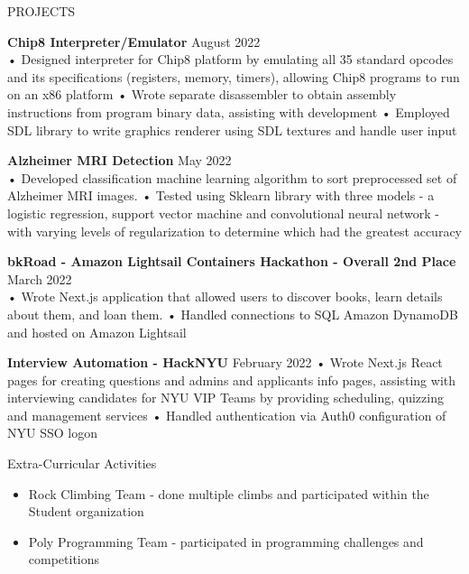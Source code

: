 \documentclass{resume} %
\begin{document}
\begin{rSection}{PROJECTS}

\textbf{Chip8 Interpreter/Emulator } \hfill August 2022 \\
• Designed interpreter for Chip8 platform by emulating all 35 standard opcodes and its specifications (registers, memory, timers), allowing Chip8 programs to run on an x86 platform \newline
• Wrote separate disassembler to obtain assembly instructions from program binary data, assisting with development  \newline
• Employed SDL library to write graphics renderer using SDL textures and handle user input \smallskip

\textbf{Alzheimer MRI Detection } \hfill May 2022 \\
• Developed classification machine learning algorithm to sort preprocessed set of Alzheimer MRI images. 
\newline
• Tested using Sklearn library with three models - a logistic regression, support vector machine and convolutional neural network - with varying levels of regularization to determine which had the greatest accuracy 

\textbf{bkRoad - Amazon Lightsail Containers Hackathon - Overall 2nd Place } \hfill March 2022 \\
• Wrote Next.js application that allowed users to discover books, learn details about them, and loan them. \newline
• Handled connections to SQL Amazon DynamoDB and hosted on Amazon Lightsail

\textbf{Interview Automation - HackNYU} \hfill February 2022 \newline
• Wrote Next.js React pages for creating questions and admins and  applicants info pages, assisting with interviewing candidates for NYU VIP Teams by providing scheduling, quizzing and management services\newline
• Handled authentication via Auth0 configuration of NYU SSO logon \smallskip

\end{rSection} 

\begin{rSection}{Extra-Curricular Activities} 
\begin{itemize} %
    \item   Rock Climbing Team - done multiple climbs and participated within the Student organization
    \item 	Poly Programming Team - participated in programming challenges and competitions

\end{itemize}

\end{rSection}
\end{document}
